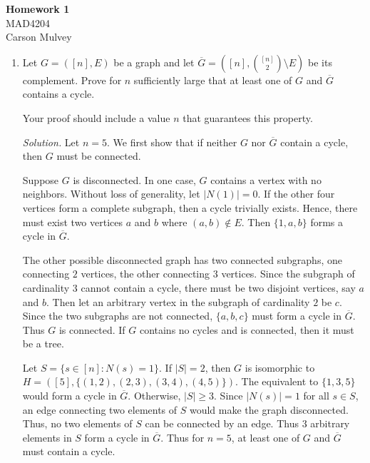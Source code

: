 \documentclass[11pt,letterpaper]{article}
\newenvironment{solution}{\color{blue}\textit{Solution.}}{\color{black}}
\begin{document}
\begin{center}
    \begin{large}
        \textbf{Homework 1} \\
        MAD4204 \\
        Carson Mulvey
    \end{large}
\end{center}

\begin{enumerate}

    \item Let $G = ([n],E)$ be a graph and let $\overline{G} = ([n], \binom{[n]}{2} \setminus E)$ be its complement.
    Prove for $n$ sufficiently large that at least one of $G$ and $\overline{G}$ contains a cycle.
    
    Your proof should include a value $n$ that guarantees this property.

    \begin{solution}
        Let $n=5$. We first show that if neither $G$ nor $\overline{G}$ contain a cycle, then $G$ must be connected. 
        
        
        Suppose $G$ is disconnected. In one case, $G$ contains a vertex with no neighbors. Without loss of generality, let $|N(1)|=0$. If the other four vertices form a complete subgraph, then a cycle trivially exists. Hence, there must exist two vertices $a$ and $b$ where $(a,b)\notin{E}$. Then $\{1,a,b\}$ forms a cycle in $\overline{G}$. 
        
        The other possible disconnected graph has two connected subgraphs, one connecting $2$ vertices, the other connecting $3$ vertices. Since the subgraph of cardinality $3$ cannot contain a cycle, there must be two disjoint vertices, say $a$ and $b$. Then let an arbitrary vertex in the subgraph of cardinality $2$ be $c$. Since the two subgraphs are not connected, $\{a,b,c\}$ must form a cycle in $\overline{G}$. Thus $G$ is connected. If $G$ contains no cycles and is connected, then it must be a tree.

        Let $S=\{s\in{[n]}:N(s)=1\}$. If $|S|=2$, then $G$ is isomorphic to $H=([5],\{(1,2),(2,3),(3,4),(4,5)\})$. The equivalent to $\{1,3,5\}$ would form a cycle in $\overline{G}$. Otherwise, $|S|\geq3$. Since $|N(s)|=1$ for all $s\in{S}$, an edge connecting two elements of $S$ would make the graph disconnected. Thus, no two elements of $S$ can be connected by an edge. Thus $3$ arbitrary elements in $S$ form a cycle in $\overline{G}$. Thus for $n=5$, at least one of $G$ and $\overline{G}$ must contain a cycle.


\end{solution}
\end{enumerate}
\end{document}

